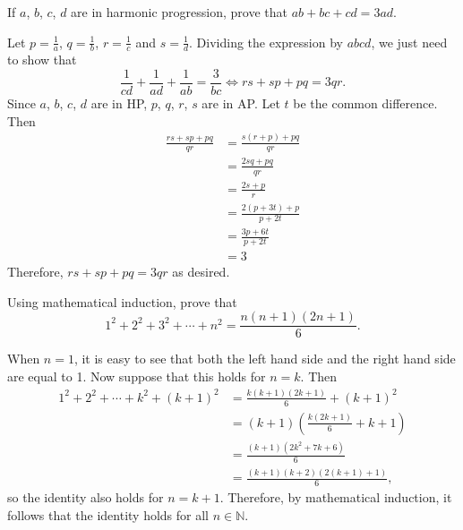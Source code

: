 \begin{question}
    If $a$, $b$, $c$, $d$ are in harmonic progression, prove that $ab + bc + cd
    = 3ad$.
\end{question}
\begin{solution}
    Let $p = \frac{1}{a}$, $q = \frac{1}{b}$, $r = \frac{1}{c}$ and $s =
    \frac{1}{d}$. Dividing the expression by $abcd$, we just need to show that
    \[\frac{1}{cd} + \frac{1}{ad} + \frac{1}{ab} = \frac{3}{bc}
    \Longleftrightarrow rs + sp + pq = 3qr.\]
    Since $a$, $b$, $c$, $d$ are in HP, $p$, $q$, $r$, $s$ are in AP. Let $t$
    be the common difference. Then
    \begin{align*}
        \frac{rs + sp + pq}{qr} &= \frac{s(r + p) + pq}{qr}\\
        &= \frac{2sq + pq}{qr}\\
        &= \frac{2s + p}{r}\\
        &= \frac{2(p + 3t) + p}{p + 2t}\\
        &= \frac{3p + 6t}{p + 2t}\\
        &= 3
    \end{align*}
    Therefore, $rs + sp + pq = 3qr$ as desired.
\end{solution}

\begin{question}
    Using mathematical induction, prove that 
    \[1^2 + 2^2 + 3^2 + \cdots + n^2 = \frac{n(n + 1)(2n + 1)}{6}.\]
\end{question}
\begin{solution}
    When $n = 1$, it is easy to see that both the left hand side and the right
    hand side are equal to 1. Now suppose that this holds for $n = k$. Then
    \begin{align*}
        1^2 + 2^2 + \cdots + k^2 + (k + 1)^2 &= \frac{k(k + 1)(2k + 1)}{6} + (k + 1)^2\\
        &= (k + 1)\left( \frac{k(2k + 1)}{6} + k + 1 \right)\\
        &= \frac{(k + 1)(2k^2 + 7k + 6)}{6}\\
        &= \frac{(k + 1)(k + 2)(2(k + 1) + 1)}{6},
    \end{align*}
    so the identity also holds for $n = k + 1$. Therefore, by mathematical
    induction, it follows that the identity holds for all $n \in \mathbb{N}$.
\end{solution}

